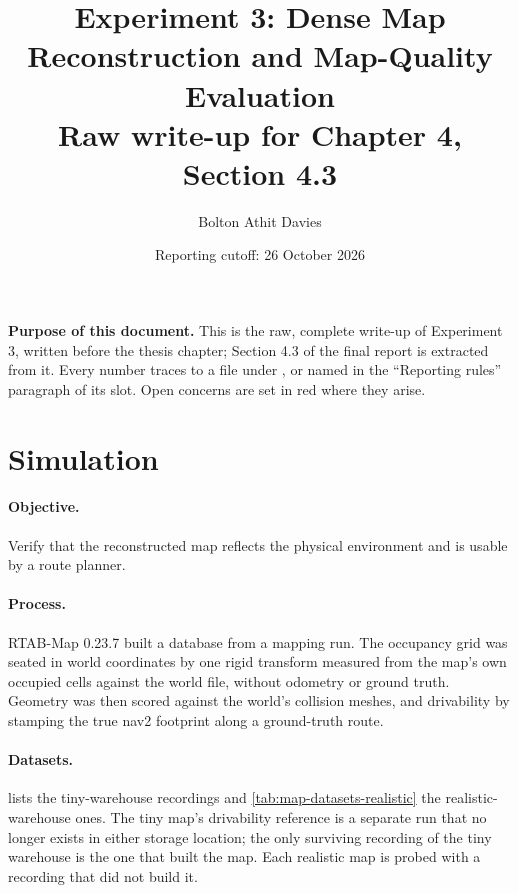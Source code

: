 \documentclass[11pt,a4paper,notitlepage]{report}
\title{Experiment 3: Dense Map Reconstruction and Map-Quality Evaluation\\
       \large Raw write-up for Chapter 4, Section 4.3}
\author{Bolton Athit Davies}
\date{Reporting cutoff: 26 October 2026}
\begin{document}
\maketitle

\noindent\textbf{Purpose of this document.} This is the raw, complete write-up
of Experiment 3, written before the thesis chapter; Section 4.3 of the final
report is extracted from it. Every number traces to a file under ,
 or  named in the ``Reporting rules'' paragraph of its
slot. Open concerns are set in red where they arise.

\section{Simulation}
\label{sec:map-sim}


\paragraph{Objective.} Verify that the reconstructed map reflects the physical
environment and is usable by a route planner.

\paragraph{Process.} RTAB-Map 0.23.7 built a database from a mapping run. The
occupancy grid was seated in world coordinates by one rigid transform measured
from the map's own occupied cells against the world file, without odometry or
ground truth. Geometry was then scored against the world's collision meshes, and
drivability by stamping the true nav2 footprint along a ground-truth route.

\paragraph{Datasets.}  lists the tiny-warehouse
recordings and \cref{tab:map-datasets-realistic} the realistic-warehouse ones.
The tiny map's drivability reference is a separate run that no longer exists in
either storage location; the only surviving recording of the tiny warehouse is
the one that built the map. Each realistic map is probed with a recording that
did not build it.
\end{document}
